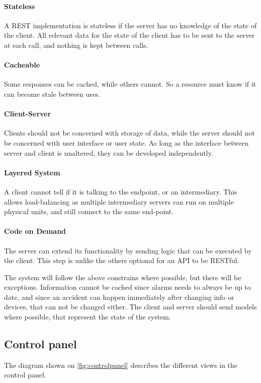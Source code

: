 \paragraph{Stateless} A REST implementation is stateless if the server has no knowledge of the state of the client. All relevant data for the state of the client has to be sent to the server at each call, and nothing is kept between calls.

\paragraph{Cacheable} Some responses can be cached, while others cannot. So a resource must know if it can become stale between uses.

\paragraph{Client-Server} Clients should not be concerned with storage of data, while the server should not be concerned with user interface or user state. As long as the interface between server and client is unaltered, they can be developed independently.

\paragraph{Layered System} A client cannot tell if it is talking to the endpoint, or an intermediary. This allows load-balancing as multiple intermediary servers can run on multiple physical units, and still connect to the same end-point.

\paragraph{Code on Demand} The server can extend its functionality by sending logic that can be executed by the client. This step is unlike the others optional for an API to be RESTful.

The system will follow the above constrains where possible, but there will be exceptions. Information cannot be cached since alarms needs to always be up to date, and since an accident can happen immediately after changing info or devices, that can not be changed either. The client and server should send models where possible, that represent the state of the system.

\subsection{Control panel}
The diagram shown on \ref{fig:controlpanel} describes the different views in the control panel. 

